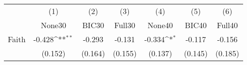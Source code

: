 {
\def\sym#1{\ifmmode^{#1}\else\(^{#1}\)\fi}
\begin{tabular}{l*{6}{c}}
\toprule
            &\multicolumn{1}{c}{(1)}&\multicolumn{1}{c}{(2)}&\multicolumn{1}{c}{(3)}&\multicolumn{1}{c}{(4)}&\multicolumn{1}{c}{(5)}&\multicolumn{1}{c}{(6)}\\
            &\multicolumn{1}{c}{None30}&\multicolumn{1}{c}{BIC30}&\multicolumn{1}{c}{Full30}&\multicolumn{1}{c}{None40}&\multicolumn{1}{c}{BIC40}&\multicolumn{1}{c}{Full40}\\
\midrule
Faith       &      -0.428\sym{**} &      -0.293         &      -0.131         &      -0.334\sym{*}  &      -0.117         &      -0.156         \\
            &     (0.152)         &     (0.164)         &     (0.155)         &     (0.137)         &     (0.145)         &     (0.185)         \\
\bottomrule
\end{tabular}
}

